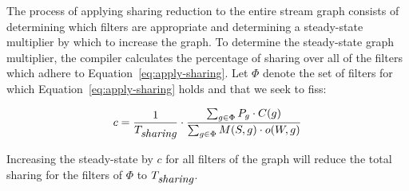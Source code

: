 The process of applying sharing reduction to the entire stream graph
consists of determining which filters are appropriate and determining
a steady-state multiplier by which to increase the graph.  To
determine the steady-state graph multiplier, the compiler calculates
the percentage of sharing over all of the filters which adhere to
Equation~\ref{eq:apply-sharing}.  Let $\Phi$ denote the set of filters
for which Equation~\ref{eq:apply-sharing} holds and that we seek to
fiss:

\begin{equation}
\label{eq:sr-mult}
c = \frac{1}{T_{\mt{sharing}}} \cdot \frac{\sum_{g \in \Phi} P_g \cdot C(g) }{\sum _{g \in
    \Phi} M(S, g) \cdot o(W, g)}
\end{equation}

\noindent Increasing the steady-state by $c$ for all filters of the
graph will reduce the total sharing for the filters of $\Phi$ to
$T_{\mbox{\it sharing}}$.  









